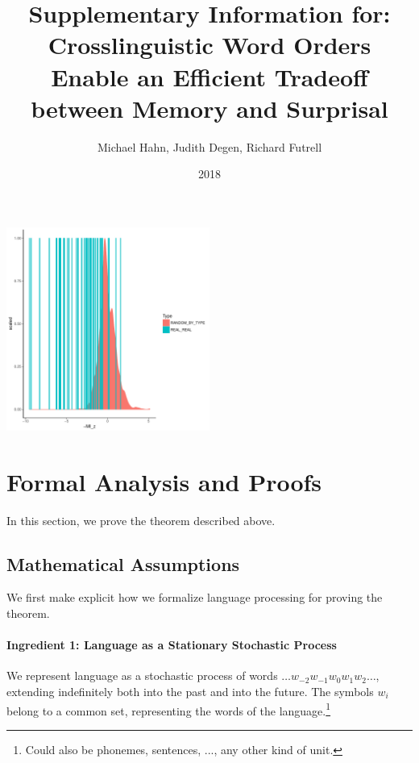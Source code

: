 \documentclass[11pt,letterpaper]{article}
\title{Supplementary Information for: Crosslinguistic Word Orders Enable an Efficient Tradeoff between Memory and Surprisal}
\author{Michael Hahn, Judith Degen, Richard Futrell}
\date{2018}
\newcounter{theorem}
\begin{document}
\maketitle





\begin{center}
\includegraphics[width=0.5\textwidth]{../code/analysis/visualize_neural/figures/full-REAL-listener-surprisal-memory-HIST_z_byMem_onlyWordForms_boundedVocab.pdf}
\label{fig:hist-real}
\end{center}




\section{Formal Analysis and Proofs}

In this section, we prove the theorem described above.

\subsection{Mathematical Assumptions}

We first make explicit how we formalize language processing for proving the theorem.

\paragraph{Ingredient 1: Language as a Stationary Stochastic Process}
We represent language as a stochastic process of words $\dots w_{-2} w_{-1} w_0 w_{1} w_{2} \dots$, extending indefinitely both into the past and into the future.
The symbols $w_i$ belong to a common set, representing the words of the language.\footnote{Could also be phonemes, sentences, ..., any other kind of unit.}
\end{document}

